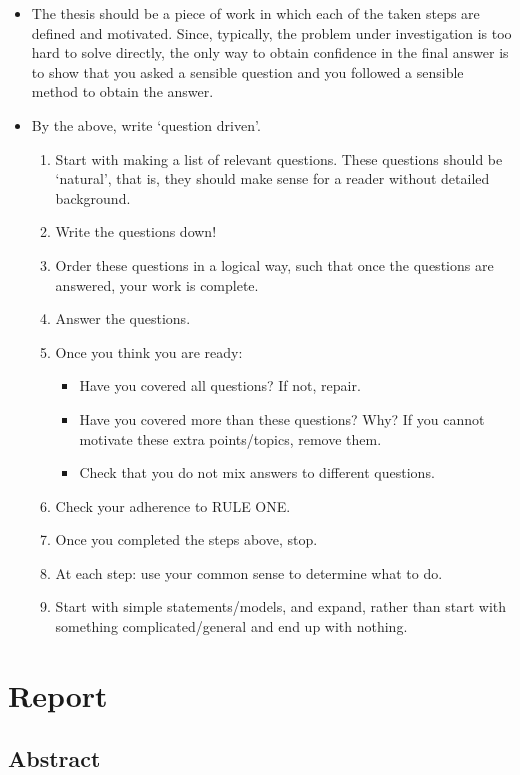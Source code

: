 \documentclass{article}
\begin{document}
\begin{itemize}
\item The thesis should be a piece of work in which each of the taken
  steps are defined and motivated. Since, typically, the problem under
  investigation is too hard to solve directly, the only way to obtain
  confidence in the final answer is to show that you asked a sensible
  question and you followed a sensible method to obtain the answer. 
\item By the above, write `question driven'.  
\begin{enumerate}
\item Start with making a list of relevant questions.  These questions
  should be `natural', that is, they should make sense for a reader
  without detailed background.
\item Write the questions down!
\item Order these questions in a logical way, such that once the
  questions are answered, your work is complete.
\item Answer the questions.
\item Once you think you are ready: 
  \begin{itemize}
  \item Have you covered all questions? If not, repair.
  \item Have you covered more than these questions? Why? If you cannot
    motivate these extra points/topics, remove them. 
  \item Check that you do not mix answers to different questions.
  \end{itemize}
\item Check your adherence to RULE ONE.
\item Once you completed the steps  above, stop. 
\item At each step: use your common sense to determine what to
  do. 
\item Start with simple statements/models, and expand, rather than
  start with something complicated/general and end up with nothing.
\end{enumerate}
\end{itemize}



\section{Report}
\label{sec:report}

\subsection{Abstract}
\end{document}

